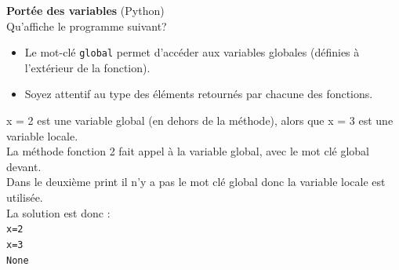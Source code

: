   \begin{Exercice}[5 minutes] \textbf{Portée des variables} (Python)\\
    Qu'affiche le programme suivant? \\

    

    
     \begin{conseil}
        \begin{itemize}
            \item Le mot-clé \lstinline{global} permet d'accéder aux variables globales (définies à l'extérieur de la fonction).
            \item Soyez attentif au type des éléments retournés par chacune des fonctions.
        \end{itemize}
     \end{conseil}
     \begin{solution}
        x = 2 est une variable global (en dehors de la méthode), alors que x = 3 est une variable locale. \\
        La méthode fonction 2 fait appel à la variable global, avec le mot clé global devant.\\
        Dans le deuxième print il n'y a pas le mot clé global donc la variable locale est utilisée.\\
        La solution est donc :\\ 
        \lstinline{x=2}\\ 
        \lstinline{x=3}\\
        \lstinline[language={bash}]{None}\\
    \end{solution}
 \end{Exercice}

